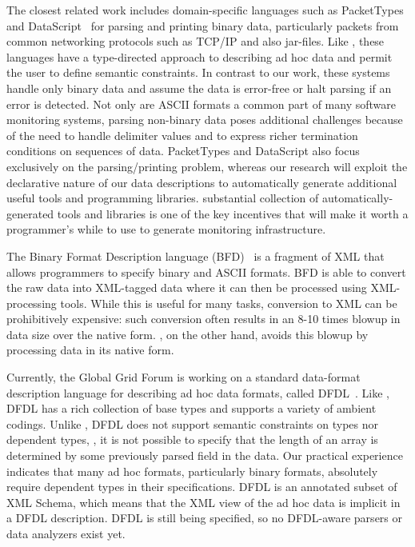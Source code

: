 \documentclass[10pt]{article}
\begin{document}
The closest related work includes domain-specific
languages such as PacketTypes~\cite{sigcomm00} and DataScript~\cite{gpce02} 
for parsing and printing binary data, particularly packets
from common networking protocols such as \textsc{TCP/IP} and also
\java{} jar-files.  Like \pads{}, these languages have a type-directed
approach to describing ad hoc data and permit the user to define
semantic constraints.  In contrast to our work, these systems handle
only binary data and assume the data is error-free or halt parsing if
an error is detected.  Not only are ASCII formats a common part of
many software monitoring systems, parsing non-binary data poses additional
challenges because of the need to handle delimiter values and to
express richer termination conditions on sequences of data. 
PacketTypes and DataScript also focus exclusively on the 
parsing/printing problem,
whereas our research will exploit the declarative nature of our data
descriptions to automatically generate additional useful tools and
programming libraries.  \pads{} substantial 
collection of automatically-generated tools and libraries is 
one of the key incentives that will make it
worth a programmer's while to use \pads to generate monitoring infrastructure.

The Binary Format Description language (BFD)~\cite{bfd} is a fragment of
XML that allows programmers to specify binary and ASCII formats.  BFD
is able to convert the raw data into XML-tagged data where it can then be
processed using XML-processing tools.  While this is useful for many
tasks, conversion to XML can be prohibitively expensive:  such conversion
often results in an 8-10 times blowup in data size over the native form.
\pads{}, on the other hand, avoids this blowup by processing data in its 
native form.

Currently, the Global Grid Forum is working on a standard
data-format description language for describing ad hoc data formats,
called DFDL~\cite{dfdl-proposal,dfdl-primer}.  Like \pads{},
DFDL{} has a rich collection of base types and supports a variety of
ambient codings.  Unlike \pads{}, DFDL{} does not support semantic
constraints on types nor dependent types, \eg{}, it is not possible to
specify that the length of an array is determined by some previously parsed field in the
data.  Our practical experience indicates that many ad hoc formats,
particularly binary formats, absolutely require dependent types in their
specifications.  DFDL{} is an annotated subset of XML{} Schema, which means
that the XML{} view of the ad hoc data is implicit in a DFDL{}
description.  DFDL{} is still being specified, so no DFDL-aware
parsers or data analyzers exist yet.  
\end{document}
